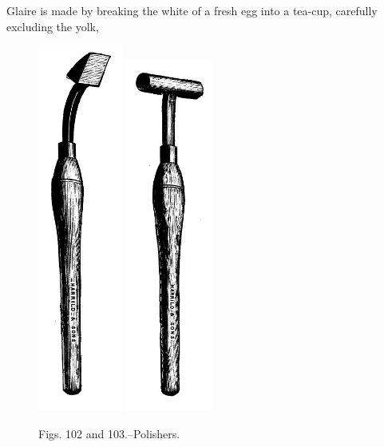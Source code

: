 \documentclass[twoside]{book}
\begin{document}
Glaire is made by breaking the white of a fresh
egg into a tea-cup, carefully excluding the yolk,
	\begin{figure}[h]
		\centering
		\includegraphics[width=0.25\textwidth]{Figures/_102.png}
		\includegraphics[width=0.25\textwidth]{Figures/_103.png}
		\caption*{Figs. 102 and 103.--Polishers.}
	\end{figure}
\end{document}
